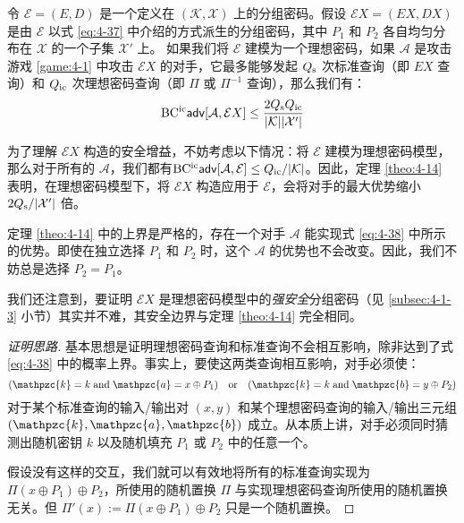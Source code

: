 \begin{theorem}\label{theo:4-14}
令 $\mathcal{E}=(E,D)$ 是一个定义在 $(\mathcal{K},\mathcal{X})$ 上的分组密码。假设 $\mathcal{E}X=(EX,DX)$ 是由 $\mathcal{E}$ 以式 \ref{eq:4-37} 中介绍的方式派生的分组密码，其中 $P_1$ 和 $P_2$ 各自均匀分布在 $\mathcal{X}$ 的一个子集 $\mathcal{X}'$ 上。 如果我们将 $\mathcal{E}$ 建模为一个理想密码，如果 $\mathcal{A}$ 是攻击游戏 \ref{game:4-1} 中攻击 $\mathcal{E}X$ 的对手，它最多能够发起 $Q_{\rm s}$ 次标准查询（即 $EX$ 查询）和 $Q_{\rm ic}$ 次理想密码查询（即 $\Pi$ 或 $\Pi^{-1}$ 查询），那么我们有：
\begin{equation}\label{eq:4-38}
{\rm BC^{ic}\mathsf{adv}}[\mathcal{A},\mathcal{E}X]\leq\frac{2Q_{\rm s}Q_{\rm ic}}{|\mathcal{K}||\mathcal{X}'|}
\end{equation}
\end{theorem}
\noindent
为了理解 $\mathcal{E}X$ 构造的安全增益，不妨考虑以下情况：将 $\mathcal{E}$ 建模为理想密码模型，那么对于所有的 $\mathcal{A}$，我们都有${\rm BC^{ic}\mathsf{adv}}[\mathcal{A},\mathcal{E}]\leq{Q_{\rm ic}}/{|\mathcal{K}|}$。因此，定理 \ref{theo:4-14} 表明，在理想密码模型下，将 $\mathcal{E}X$ 构造应用于 $\mathcal{E}$，会将对手的最大优势缩小 ${2Q_{\rm s}}/{|\mathcal{X}'|}$ 倍。

定理 \ref{theo:4-14} 中的上界是严格的，存在一个对手 $\mathcal{A}$ 能实现式 \ref{eq:4-38} 中所示的优势。即使在独立选择 $P_1$ 和 $P_2$ 时，这个 $\mathcal{A}$ 的优势也不会改变。因此，我们不妨总是选择 $P_2=P_1$。

我们还注意到，要证明 $\mathcal{E}X$ 是理想密码模型中的\emph{强安全}分组密码（见 \ref{subsec:4-1-3} 小节）其实并不难，其安全边界与定理 \ref{theo:4-14} 完全相同。

\begin{proof}[证明思路]
基本思想是证明理想密码查询和标准查询不会相互影响，除非达到了式 \ref{eq:4-38} 中的概率上界。事实上，要使这两类查询相互影响，对手必须使：
\[
(\mathpzc{k}=k\;{\rm and}\;\mathpzc{a}=x\oplus P_1)
\quad\text{or}\quad
(\mathpzc{k}=k\;{\rm and}\;\mathpzc{b}=y\oplus P_2)
\]
对于某个标准查询的输入/输出对 $(x,y)$ 和某个理想密码查询的输入/输出三元组 $(\mathpzc{k},\mathpzc{a},\mathpzc{b})$ 成立。从本质上讲，对手必须同时猜测出随机密钥 $k$ 以及随机填充 $P_1$ 或 $P_2$ 中的任意一个。

假设没有这样的交互，我们就可以有效地将所有的标准查询实现为 $\Pi(x\oplus P_1)\oplus P_2$，所使用的随机置换 $\Pi$ 与实现理想密码查询所使用的随机置换无关。但 $\Pi'(x):=\Pi(x\oplus P_1)\oplus P_2$ 只是一个随机置换。
\end{proof}

